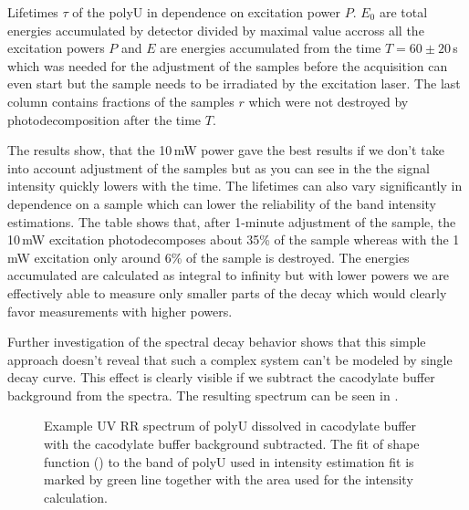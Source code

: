 \begin{table}
	\centering
	
	\caption{Lifetimes $\tau$ of the polyU in dependence on excitation power
		$P$. $E_0$ are total energies accumulated by detector divided by maximal
		value accross all the excitation powers $P$ and $E$ are energies
		accumulated from the time $T = 60\pm20$\,s which was needed for the
		adjustment of the samples before the acquisition can even start but
		the sample needs to be irradiated by the excitation laser. The last column
		contains fractions of the samples $r$ which were not destroyed by
		photodecomposition after the time $T$.
	}
	\label{\tablabel{power_optim:lifetimes_triplexes}}
\end{table}

The results show, that the 10\,mW power gave the best results if we don't take
into account adjustment of the samples but as you can see in the
the signal intensity quickly lowers with the time. The lifetimes can also
vary significantly in dependence on a sample which can lower the reliability of
the band intensity estimations. The table shows that, after
1-minute adjustment of the sample, the 10\,mW excitation photodecomposes
about 35\% of the sample whereas with the 1\,mW excitation only around 6\% of
the sample is destroyed. The energies accumulated are calculated as integral
to infinity but with lower powers we are effectively able to measure only
smaller parts of the decay which would clearly favor measurements with higher
powers.

Further investigation of the spectral decay behavior shows that this simple
approach doesn't reveal that such a complex system can't be modeled by single
decay curve. This effect is clearly visible if we subtract the cacodylate
buffer background from the spectra. The resulting spectrum can be seen in
.

\begin{figure}
	\centering
	
	\caption{Example UV RR spectrum of polyU dissolved in cacodylate buffer with
	  the cacodylate buffer background subtracted. The fit of shape function
		()
		to the band of polyU used in intensity estimation fit is marked by green
		line together with the area used for the intensity calculation.}
	\label{\figlabel{power_optim:triplexes2_pU}}
\end{figure}

